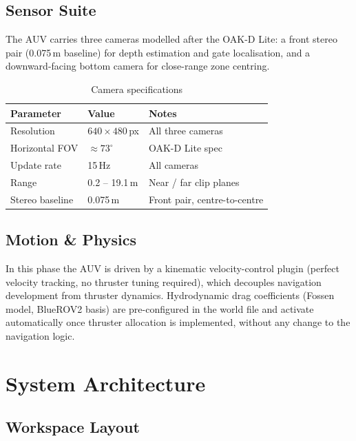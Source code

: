 \documentclass[11pt,a4paper]{article}
\begin{document}
\subsection{Sensor Suite}

The AUV carries three cameras modelled after the OAK-D Lite: a front stereo
pair (0.075\,m baseline) for depth estimation and gate localisation, and a
downward-facing bottom camera for close-range zone centring.

\begin{table}[H]
\centering
\caption{Camera specifications}
\begin{tabular}{L{4.2cm} L{3.4cm} L{5cm}}
  \toprule
  \textbf{Parameter} & \textbf{Value} & \textbf{Notes} \\
  \midrule
  Resolution      & $640\times480$\,px & All three cameras \\
  Horizontal FOV  & $\approx73^\circ$  & OAK-D Lite spec \\
  Update rate     & 15\,Hz             & All cameras \\
  Range           & 0.2 -- 19.1\,m     & Near / far clip planes \\
  Stereo baseline & 0.075\,m           & Front pair, centre-to-centre \\
  \bottomrule
\end{tabular}
\end{table}

\subsection{Motion \& Physics}

In this phase the AUV is driven by a kinematic velocity-control plugin
(perfect velocity tracking, no thruster tuning required), which decouples
navigation development from thruster dynamics. Hydrodynamic drag
coefficients (Fossen model, BlueROV2 basis) are pre-configured in the world
file and activate automatically once thruster allocation is implemented,
without any change to the navigation logic.

\section{System Architecture}

\subsection{Workspace Layout}
\end{document}
